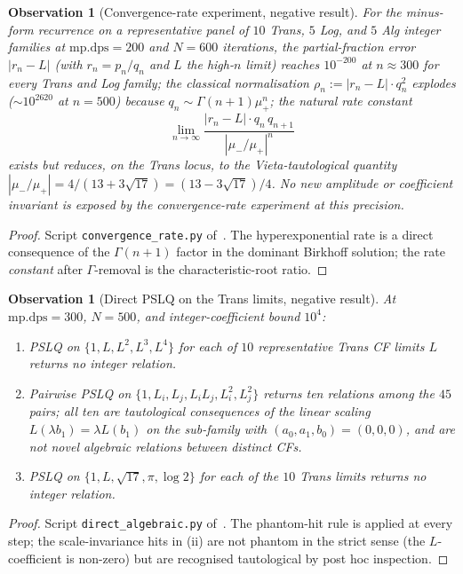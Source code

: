 \documentclass[11pt]{amsart}
\newtheorem{observation}[theorem]{Observation}
\theoremstyle{definition}
\theoremstyle{remark}
\begin{document}
\begin{observation}[Convergence-rate experiment, negative result]
\label{prop:rate}
For the minus-form recurrence on a representative panel of $10$
Trans, $5$ Log, and $5$ Alg integer families at $\mathrm{mp.dps}=200$
and $N=600$ iterations, the partial-fraction error
$|r_n - L|$ (with $r_n = p_n/q_n$ and $L$ the high-$n$ limit) reaches
$10^{-200}$ at $n\approx 300$ for every Trans and Log family;
the classical normalisation $\rho_n := |r_n-L|\cdot q_n^2$ explodes
($\sim\!10^{2620}$ at $n=500$) because $q_n \sim \Gamma(n+1)\mu_+^n$;
the natural rate constant
\[
  \lim_{n\to\infty}\frac{|r_n - L|\cdot q_n\,q_{n+1}}{|\mu_-/\mu_+|^n}
\]
exists but reduces, on the Trans locus, to the
Vieta-tautological quantity
$|\mu_-/\mu_+| = 4/(13+3\sqrt{17}) = (13-3\sqrt{17})/4$.  No new
amplitude or coefficient invariant is exposed by the convergence-rate
experiment at this precision.
\end{observation}
\begin{proof}
Script \texttt{convergence\_rate.py} of~\cite{SprintW3Report}.
The hyperexponential rate is a direct consequence of the
$\Gamma(n+1)$ factor in the dominant Birkhoff solution; the rate
\emph{constant} after $\Gamma$-removal is the characteristic-root ratio.
\end{proof}

\begin{observation}[Direct PSLQ on the Trans limits, negative result]
\label{prop:pslq-direct}
At $\mathrm{mp.dps} = 300$, $N=500$, and integer-coefficient bound
$10^4$:
\begin{enumerate}[label={\upshape(\roman*)}]
\item PSLQ on $\{1,L,L^2,L^3,L^4\}$ for each of $10$ representative
Trans CF limits $L$ returns no integer relation.
\item Pairwise PSLQ on $\{1,L_i,L_j,L_iL_j,L_i^2,L_j^2\}$ returns ten
relations among the $45$ pairs; all ten are tautological consequences
of the linear scaling $L(\lambda b_1) = \lambda L(b_1)$ on the
sub-family with $(a_0,a_1,b_0) = (0,0,0)$, and are not novel
algebraic relations between distinct CFs.
\item PSLQ on $\{1,L,\sqrt{17},\pi,\log 2\}$ for each of the $10$
Trans limits returns no integer relation.
\end{enumerate}
\end{observation}
\begin{proof}
Script \texttt{direct\_algebraic.py} of~\cite{SprintW3Report}.
The phantom-hit rule is applied at every step; the scale-invariance
hits in (ii) are not phantom in the strict sense (the
$L$-coefficient is non-zero) but are recognised tautological by post
hoc inspection.
\end{proof}
\end{document}
